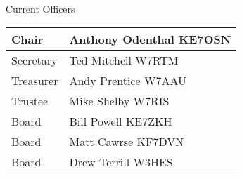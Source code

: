 \documentclass[letter,11pt]{extarticle}
\begin{document}

	Current Officers \\
	\begin{tabular}{|l|l|} \hline
		Chair & Anthony Odenthal KE7OSN \\ \hline
		Secretary & Ted Mitchell W7RTM \\ \hline
		Treasurer & Andy Prentice W7AAU \\ \hline
		Trustee & Mike Shelby W7RIS   \\ \hline
		Board & Bill Powell KE7ZKH \\ \hline
		Board & Matt Cawrse KF7DVN \\ \hline
		Board & Drew Terrill W3HES\\ \hline
	\end{tabular}
	
	\subsection*{}
	
\end{document}
